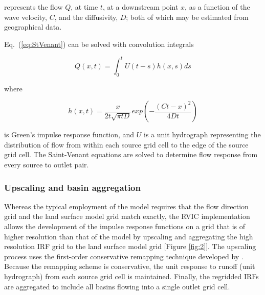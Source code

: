 \documentclass[jgrga, draft]{agutex}
\begin{document}
\begin{article}
represents the flow $Q$, at time $t$, at a downstream point $x$, as a function of the wave velocity, $C$, and the diffusivity, $D$; both of which may be estimated from geographical data.

Eq.~(\ref{eq:StVenant}) can be solved with convolution integrals

 \begin{equation}
   \label{eq:ConvIntegral}
	  Q(x,t) = \int_0^t U(t-s)h(x,s)ds
 \end{equation}

where

 \begin{equation}
   \label{eq:GreensIRF}
	h(x, t) = \frac{x}{2t\sqrt{\pi tD}}exp\left(-\frac{(Ct-x)^2}{4Dt}\right)
 \end{equation}

is Green's impulse response function, and $U$ is a unit hydrograph representing the distribution of flow from within each source grid cell to the edge of the source grid cell.
The Saint-Venant equations are solved to determine flow response from every source to outlet pair.

\subsubsection{Upscaling and basin aggregation}
\label{sec:remap}

Whereas the typical employment of the \citet{Lohmann_1996} model requires that the flow direction grid and the land surface model grid match exactly, the RVIC implementation allows the development of the impulse response functions on a grid that is of higher resolution than that of the model by upscaling and aggregating the high resolution IRF grid to the land surface model grid [Figure \ref{fig:2}].
The upscaling process uses the first-order conservative remapping technique developed by \citep{Jones_1999}.
Because the remapping scheme is conservative, the unit response to runoff (unit hydrograph) from each source grid cell is maintained.
Finally, the regridded IRFs are aggregated to include all basins flowing into a single outlet grid cell.


\end{article}
\end{document}
